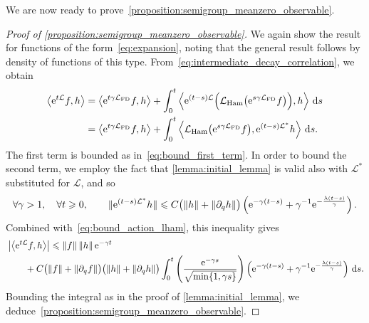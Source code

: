 \documentclass[11pt,a4paper]{article}
\newcommand{\e}{\mathrm{e}}
\renewcommand{\d}{\mathrm d}
\theoremstyle{plain}
\numberwithin{equation}{section}
\renewcommand{\leq}{\leqslant}
\renewcommand{\geq}{\geqslant}
\begin{document}
We are now ready to prove~\cref{proposition:semigroup_meanzero_observable}.
\begin{proof}
    [Proof of \cref{proposition:semigroup_meanzero_observable}]
    We again show the result for functions of the form~\eqref{eq:expansion},
    noting that the general result follows by density of functions of this type.
    From~\eqref{eq:intermediate_decay_correlation}, we obtain
    \begin{align}
        \notag
        \ip{\e^{t \mathcal L} f}{h}
        &= \ip{\e^{t \gamma \mathcal L_{\rm FD}} f}{h}
        + \int_{0}^t \ip{\e^{(t-s) \mathcal L} \Bigl( \mathcal L_{\rm Ham} \bigl(\e^{s \gamma \mathcal L_{\rm FD}} f\bigr) \Bigr)}{h} \, \d s \\
        &= \ip{\e^{t \gamma \mathcal L_{\rm FD}} f}{h}
        + \int_{0}^t \ip{ \mathcal L_{\rm Ham} \bigl(\e^{s \gamma \mathcal L_{\rm FD}} f\bigr) }{\e^{(t-s) \mathcal L^*}  h} \, \d s.
    \end{align}
    The first term is bounded as in~\eqref{eq:bound_first_term}.
    In order to bound the second term,
    we employ the fact that \cref{lemma:initial_lemma} is valid also with $\mathcal L^*$ substituted for $\mathcal L$,
    and so
    \[
        \forall \gamma > 1, \quad
        \forall t \geq 0, \qquad
        \norm*{\e^{(t-s)\mathcal L^*} h}
        \leq C \bigl( \norm{h} + \norm{\partial_q h} \bigr)
        \left( \e^{- \gamma (t-s)} + \gamma^{-1} \e^{-\frac{\lambda (t-s)}{\gamma}} \right).
    \]
    Combined with~\eqref{eq:bound_action_lham},
    this inequality gives
    \begin{align*}
        & \abs{ \ip{\e^{t \mathcal L} f}{h}}
        \leq \norm{f} \norm{h} \e^{-\gamma t} \\
        & \qquad + C \bigl( \norm{f} + \norm{\partial_q f} \bigr) \bigl( \norm{h} + \norm{\partial_q h} \bigr)
            \int_{0}^{t}  \left( \frac{\e^{-\gamma s}}{\sqrt{\min\{1, \gamma s\}}} \right)
         \left(  \e^{- \gamma (t-s)} + \gamma^{-1} \e^{-\frac{\lambda (t-s)}{\gamma}} \right) \, \d s.
    \end{align*}
    Bounding the integral as in the proof of \cref{lemma:initial_lemma},
    we deduce~\cref{proposition:semigroup_meanzero_observable}.
\end{proof}
\end{document}
